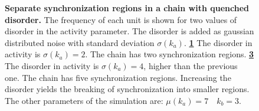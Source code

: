 \documentclass[11pt, a4paper]{article} %
\begin{document}
\begin{figure}
    \begin{subfigure}{0.48\textwidth}
        \caption{}
        \label{fig:chain_disorder1}
    \end{subfigure}
    \hfill
    \begin{subfigure}{0.48\textwidth}
    \caption{}
    \label{fig:chain_disorder2}
    \end{subfigure}
    \caption{\textbf{Separate synchronization regions in a chain with quenched disorder.}
    The frequency of each unit is shown for two values of disorder in the activity parameter. 
    The disorder is added as gaussian distributed noise with standard deviation $\sigma(k_a)$. 
    \textbf{\ref{fig:chain_disorder1}} The disorder in activity is $\sigma(k_a)=2$. The chain has two synchronization 
    regions. 
    \textbf{\ref{fig:chain_disorder2}} The disorder in activity is $\sigma(k_a)=4$, higher than the previous one. 
    The chain has five synchronization regions. 
    Increasing the disorder yields the breaking of synchronization into smaller regions. 
    The other parameters of the simulation are: $\mu(k_a)=7 \quad k_b=3$.  }
\end{figure}

\end{document}
